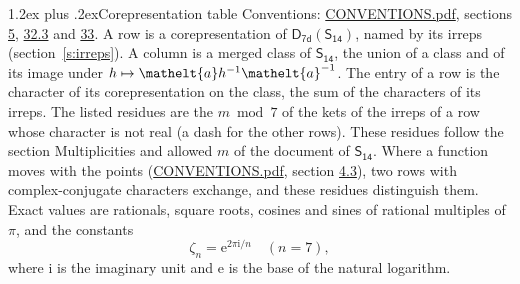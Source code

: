 \documentclass[10pt,a4paper]{article}
\makeatletter
\renewcommand\section{\@startsection{section}{1}{\z@}{-3ex plus -1ex minus -.2ex}%
  {1.2ex plus .2ex}{\normalfont\large\sffamily\bfseries\color{parttitle}}}
\numberwithin{equation}{section}
\newcommand{\eltfont}[1]{{\let\sigma\eltsigma\mathelt{#1}}}
\newcommand{\grp}[1]{\mathsf{#1}}
\newcommand{\elt}[1]{\eltfont{#1}}
\newcommand{\iunit}{\mathrm{i}}
\newcommand{\expe}{\mathrm{e}}
\newcommand{\rootunity}[1]{\zeta_{#1}}
\makeatother
\begin{document}
\section{Corepresentation table}\label{s:character_table}
Conventions: \href{../../CONVENTIONS.pdf}{CONVENTIONS.pdf}, sections \href{../../../rotation/CONVENTIONS.pdf\#conv.5}{5}, \href{../../CONVENTIONS.pdf\#conv.32.3}{32.3} and \href{../../CONVENTIONS.pdf\#conv.33}{33}.
A row is a corepresentation of $\grp{D_{7d}}(\grp{S_{14}})$, named by its irreps (section~\ref{s:irreps}). A column is a merged class of $\grp{S_{14}}$, the union of a class and of its image under $h \mapsto \elt{a} h^{-1} \elt{a}^{-1}$. The entry of a row is the character of its corepresentation on the class, the sum of the characters of its irreps.
\leavevmode\label{n:head.parity}The listed residues are the $m \bmod 7$ of the kets of the irreps of a row whose character is not real (a dash for the other rows). These residues follow the section Multiplicities and allowed $m$ of the document of \href{../../../rotation/data/pdf/S14.pdf}{$\grp{S_{14}}$}. Where a function moves with the points (\href{../../CONVENTIONS.pdf}{CONVENTIONS.pdf}, section \href{../../../rotation/CONVENTIONS.pdf\#conv.4.3}{4.3}), two rows with complex-conjugate characters exchange, and these residues distinguish them.
\leavevmode\label{n:constant.root}\label{n:index.root.order}Exact values are rationals, square roots, cosines and sines of rational multiples of $\pi$, and the constants
\begin{equation}\label{e:constants}\rootunity{n} = \expe^{2\pi\iunit/n}\quad(n = 7),\end{equation}
where $\iunit$ is the imaginary unit and $\expe$ is the base of the natural logarithm.
\end{document}
